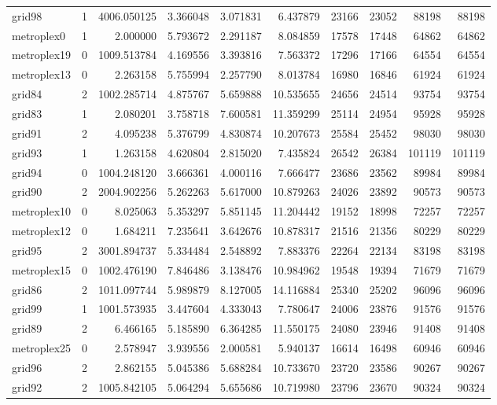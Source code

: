 \begin{longtable}{|l|r|r|r|r|r|r|r|r|r|}
grid98 & 1 & 4006.050125 & 3.366048 & 3.071831 & 6.437879 & 23166 & 23052 & 88198 & 88198 \\
metroplex0 & 1 & 2.000000 & 5.793672 & 2.291187 & 8.084859 & 17578 & 17448 & 64862 & 64862 \\
metroplex19 & 0 & 1009.513784 & 4.169556 & 3.393816 & 7.563372 & 17296 & 17166 & 64554 & 64554 \\
metroplex13 & 0 & 2.263158 & 5.755994 & 2.257790 & 8.013784 & 16980 & 16846 & 61924 & 61924 \\
grid84 & 2 & 1002.285714 & 4.875767 & 5.659888 & 10.535655 & 24656 & 24514 & 93754 & 93754 \\
grid83 & 1 & 2.080201 & 3.758718 & 7.600581 & 11.359299 & 25114 & 24954 & 95928 & 95928 \\
grid91 & 2 & 4.095238 & 5.376799 & 4.830874 & 10.207673 & 25584 & 25452 & 98030 & 98030 \\
grid93 & 1 & 1.263158 & 4.620804 & 2.815020 & 7.435824 & 26542 & 26384 & 101119 & 101119 \\
grid94 & 0 & 1004.248120 & 3.666361 & 4.000116 & 7.666477 & 23686 & 23562 & 89984 & 89984 \\
grid90 & 2 & 2004.902256 & 5.262263 & 5.617000 & 10.879263 & 24026 & 23892 & 90573 & 90573 \\
metroplex10 & 0 & 8.025063 & 5.353297 & 5.851145 & 11.204442 & 19152 & 18998 & 72257 & 72257 \\
metroplex12 & 0 & 1.684211 & 7.235641 & 3.642676 & 10.878317 & 21516 & 21356 & 80229 & 80229 \\
grid95 & 2 & 3001.894737 & 5.334484 & 2.548892 & 7.883376 & 22264 & 22134 & 83198 & 83198 \\
metroplex15 & 0 & 1002.476190 & 7.846486 & 3.138476 & 10.984962 & 19548 & 19394 & 71679 & 71679 \\
grid86 & 2 & 1011.097744 & 5.989879 & 8.127005 & 14.116884 & 25340 & 25202 & 96096 & 96096 \\
grid99 & 1 & 1001.573935 & 3.447604 & 4.333043 & 7.780647 & 24006 & 23876 & 91576 & 91576 \\
grid89 & 2 & 6.466165 & 5.185890 & 6.364285 & 11.550175 & 24080 & 23946 & 91408 & 91408 \\
metroplex25 & 0 & 2.578947 & 3.939556 & 2.000581 & 5.940137 & 16614 & 16498 & 60946 & 60946 \\
grid96 & 2 & 2.862155 & 5.045386 & 5.688284 & 10.733670 & 23720 & 23586 & 90267 & 90267 \\
grid92 & 2 & 1005.842105 & 5.064294 & 5.655686 & 10.719980 & 23796 & 23670 & 90324 & 90324 \\

\end{longtable}
